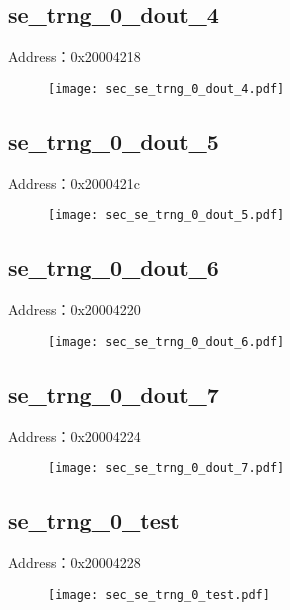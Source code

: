 \subsection{se\_trng\_0\_dout\_4}
\label{sec-se-trng-0-dout-4}
Address：0x20004218
 \begin{figure}[H]
\texttt{[image: sec\_se\_trng\_0\_dout\_4.pdf]}
\end{figure}

\subsection{se\_trng\_0\_dout\_5}
\label{sec-se-trng-0-dout-5}
Address：0x2000421c
 \begin{figure}[H]
\texttt{[image: sec\_se\_trng\_0\_dout\_5.pdf]}
\end{figure}

\subsection{se\_trng\_0\_dout\_6}
\label{sec-se-trng-0-dout-6}
Address：0x20004220
 \begin{figure}[H]
\texttt{[image: sec\_se\_trng\_0\_dout\_6.pdf]}
\end{figure}

\subsection{se\_trng\_0\_dout\_7}
\label{sec-se-trng-0-dout-7}
Address：0x20004224
 \begin{figure}[H]
\texttt{[image: sec\_se\_trng\_0\_dout\_7.pdf]}
\end{figure}

\subsection{se\_trng\_0\_test}
\label{sec-se-trng-0-test}
Address：0x20004228
 \begin{figure}[H]
\texttt{[image: sec\_se\_trng\_0\_test.pdf]}
\end{figure}

